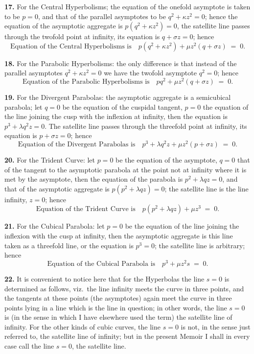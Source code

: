 \documentclass[11pt,a4paper]{article}
\begin{document}
\medskip

\textbf{17.} For the Central Hyperbolisms; the equation of the onefold asymptote is taken to be $p=0$, and that of the parallel asymptotes to be $q^{2}+\kappa z^{2}=0$; hence the equation of the asymptotic aggregate is $p(q^{2}+\kappa z^{2}) = 0$, the satellite line passes through the twofold point at infinity, its equation is $q + \sigma z = 0$; hence
\[
\text{Equation of the Central Hyperbolisms is}\quad p(q^{2}+\kappa z^{2}) + \mu z^{2}(q+\sigma z) \;=\; 0.
\]

\medskip

\textbf{18.} For the Parabolic Hyperbolisms: the only difference is that instead of the parallel asymptotes $q^{2}+\kappa z^{2}=0$ we have the twofold asymptote $q^{2}=0$; hence
\[
\text{Equation of the Parabolic Hyperbolisms is}\quad p q^{2} + \mu z^{2}(q + \sigma z) \;=\; 0.
\]

\medskip

\textbf{19.} For the Divergent Parabolas: the asymptotic aggregate is a semicubical parabola; let $q=0$ be the equation of the cuspidal tangent, $p=0$ the equation of the line joining the cusp with the inflexion at infinity, then the equation is $p^{3}+\lambda q^{2}z = 0$. The satellite line passes through the threefold point at infinity, its equation is $p + \sigma z = 0$; hence
\[
\text{Equation of the Divergent Parabolas is}\quad p^{3}+\lambda q^{2}z + \mu z^{2}(p + \sigma z) \;=\; 0.
\]

\medskip

\textbf{20.} For the Trident Curve: let $p=0$ be the equation of the asymptote, $q=0$ that of the tangent to the asymptotic parabola at the point not at infinity where it is met by the asymptote, then the equation of the parabola is $p^{2}+\lambda q z = 0$, and that of the asymptotic aggregate is $p(p^{2}+\lambda q z) = 0$; the satellite line is the line infinity, $z=0$; hence
\[
\text{Equation of the Trident Curve is}\quad p(p^{2}+\lambda q z) + \mu z^{3} \;=\; 0.
\]

\medskip

\textbf{21.} For the Cubical Parabola: let $p=0$ be the equation of the line joining the inflexion with the cusp at infinity, then the asymptotic aggregate is this line taken as a threefold line, or the equation is $p^{3}=0$; the satellite line is arbitrary; hence
\[
\text{Equation of the Cubical Parabola is}\quad p^{3} + \mu z^{2} s \;=\; 0.
\]

\medskip

\textbf{22.} It is convenient to notice here that for the Hyperbolas the line $s=0$ is determined as follows, viz.\ the line infinity meets the curve in three points, and the tangents at these points (the asymptotes) again meet the curve in three points lying in a line which is the line in question; in other words, the line $s=0$ is (in the sense in which I have elsewhere used the term) the satellite line of infinity. For the other kinds of cubic curves, the line $s=0$ is not, in the sense just referred to, the satellite line of infinity; but in the present Memoir I shall in every case call the line $s=0$, the satellite line.
\end{document}
